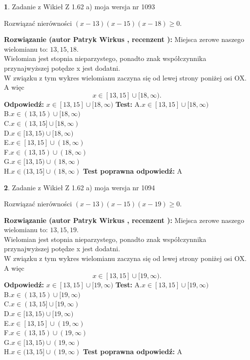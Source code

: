 \documentclass[12pt, a4paper]{article}
\theoremstyle{definition} %
\newtheorem{zad}{}
\newcommand{\zadStart}[1]{\begin{zad}#1\newline}
\newcommand{\zadStop}{\end{zad}}
\newcommand{\rozwStart}[2]{\noindent \textbf{Rozwiązanie (autor #1 , recenzent #2): }\newline}
\newcommand{\rozwStop}{\newline}
\newcommand{\odpStart}{\noindent \textbf{Odpowiedź:}\newline}
\newcommand{\odpStop}{\newline}
\newcommand{\testStart}{\noindent \textbf{Test:}\newline}
\newcommand{\testStop}{\newline}
\newcommand{\kluczStart}{\noindent \textbf{Test poprawna odpowiedź:}\newline}
\newcommand{\kluczStop}{\newline}
\begin{document}
\zadStart{Zadanie z Wikieł Z 1.62 a) moja wersja nr 1093}

Rozwiązać nierówności $(x-13)(x-15)(x-18)\ge0$.
\zadStop
\rozwStart{Patryk Wirkus}{}
Miejsca zerowe naszego wielomianu to: $13, 15, 18$.\\
Wielomian jest stopnia nieparzystego, ponadto znak współczynnika przy\linebreak najwyższej potędze x jest dodatni.\\ W związku z tym wykres wielomianu zaczyna się od lewej strony poniżej osi OX. A więc $$x \in [13,15] \cup [18,\infty).$$
\rozwStop
\odpStart
$x \in [13,15] \cup [18,\infty)$
\odpStop
\testStart
A.$x \in [13,15] \cup [18,\infty)$\\
B.$x \in (13,15) \cup [18,\infty)$\\
C.$x \in (13,15] \cup [18,\infty)$\\
D.$x \in [13,15) \cup [18,\infty)$\\
E.$x \in [13,15] \cup (18,\infty)$\\
F.$x \in (13,15) \cup (18,\infty)$\\
G.$x \in [13,15) \cup (18,\infty)$\\
H.$x \in (13,15] \cup (18,\infty)$
\testStop
\kluczStart
A
\kluczStop



\zadStart{Zadanie z Wikieł Z 1.62 a) moja wersja nr 1094}

Rozwiązać nierówności $(x-13)(x-15)(x-19)\ge0$.
\zadStop
\rozwStart{Patryk Wirkus}{}
Miejsca zerowe naszego wielomianu to: $13, 15, 19$.\\
Wielomian jest stopnia nieparzystego, ponadto znak współczynnika przy\linebreak najwyższej potędze x jest dodatni.\\ W związku z tym wykres wielomianu zaczyna się od lewej strony poniżej osi OX. A więc $$x \in [13,15] \cup [19,\infty).$$
\rozwStop
\odpStart
$x \in [13,15] \cup [19,\infty)$
\odpStop
\testStart
A.$x \in [13,15] \cup [19,\infty)$\\
B.$x \in (13,15) \cup [19,\infty)$\\
C.$x \in (13,15] \cup [19,\infty)$\\
D.$x \in [13,15) \cup [19,\infty)$\\
E.$x \in [13,15] \cup (19,\infty)$\\
F.$x \in (13,15) \cup (19,\infty)$\\
G.$x \in [13,15) \cup (19,\infty)$\\
H.$x \in (13,15] \cup (19,\infty)$
\testStop
\kluczStart
A
\kluczStop
\end{document}
